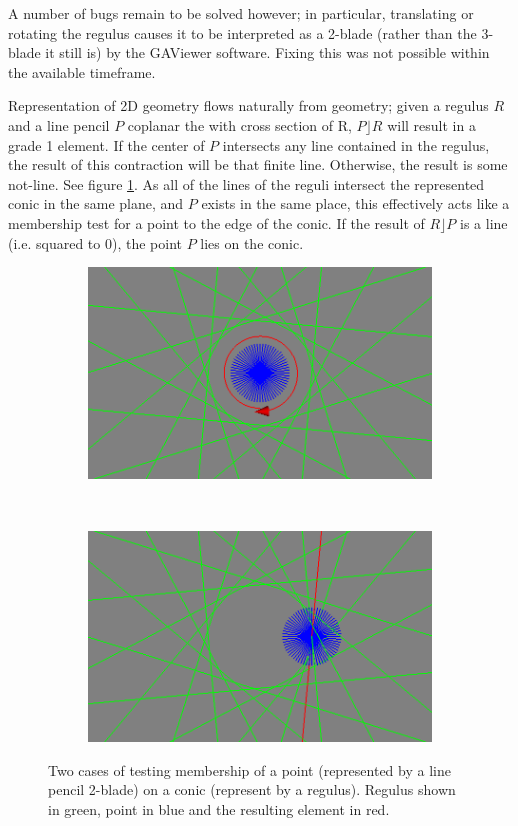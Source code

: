 \documentclass[a4paper, 10pt]{article}
\begin{document}
A number of bugs remain to be solved however; in particular, translating or
rotating the regulus causes it to be interpreted as a 2-blade (rather than the
3-blade it still is) by the GAViewer software. Fixing this was not possible
within the available timeframe.

Representation of 2D geometry flows naturally from geometry; given a regulus $R$
and a line pencil $P$ coplanar the with cross section of R, $P \rfloor R$ will
result in a grade 1 element. If the center of $P$ intersects any line contained
in the regulus, the result of this contraction will be that finite line. Otherwise, the
result is some not-line. See figure \ref{fig:2d}. As all of the lines of
the reguli intersect the represented conic in the same plane, and $P$ exists in
the same place, this effectively acts like a membership test for a point to the
edge of the conic. If the result of $R \rfloor P$ is a line (i.e. squared to 0),
the point $P$ lies on the conic.

\begin{figure}
  \centering
  \begin{subfigure}[b]{0.5\textwidth}
    \centering
    \includegraphics[width=\textwidth]{conic1.png}
  \end{subfigure}%
  ~ %
  \begin{subfigure}[b]{0.5\textwidth}
    \centering
    \includegraphics[width=\textwidth]{conic2.png}
  \end{subfigure}
  \caption{Two cases of testing membership of a point (represented by a line
    pencil 2-blade) on a conic (represent by a regulus). Regulus shown in green,
  point in blue and the resulting element in red.}
  \label{fig:2d}
\end{figure}
\end{document}
